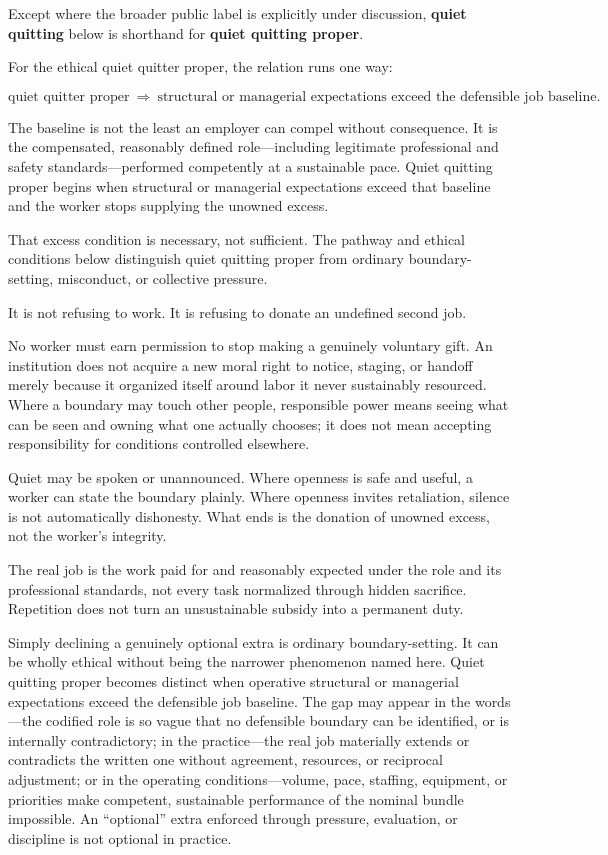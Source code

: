 \documentclass[11pt,oneside]{article}
\begin{document}
Except where the broader public label is explicitly under discussion,
\textbf{quiet quitting} below is shorthand for \textbf{quiet quitting
proper}.

For the ethical quiet quitter proper, the relation runs one way:

\[
\boxed{\text{quiet quitter proper}\ \Longrightarrow\ \text{structural or managerial expectations exceed the defensible job baseline}.}
\]

The baseline is not the least an employer can compel without
consequence. It is the compensated, reasonably defined role---including
legitimate professional and safety standards---performed competently at
a sustainable pace. Quiet quitting proper begins when structural or
managerial expectations exceed that baseline and the worker stops
supplying the unowned excess.

That excess condition is necessary, not sufficient. The pathway and
ethical conditions below distinguish quiet quitting proper from ordinary
boundary-setting, misconduct, or collective pressure.

It is not refusing to work. It is refusing to donate an undefined second
job.

No worker must earn permission to stop making a genuinely voluntary
gift. An institution does not acquire a new moral right to notice,
staging, or handoff merely because it organized itself around labor it
never sustainably resourced. Where a boundary may touch other people,
responsible power means seeing what can be seen and owning what one
actually chooses; it does not mean accepting responsibility for
conditions controlled elsewhere.

Quiet may be spoken or unannounced. Where openness is safe and useful, a
worker can state the boundary plainly. Where openness invites
retaliation, silence is not automatically dishonesty. What ends is the
donation of unowned excess, not the worker's integrity.

The real job is the work paid for and reasonably expected under the role
and its professional standards, not every task normalized through hidden
sacrifice. Repetition does not turn an unsustainable subsidy into a
permanent duty.

Simply declining a genuinely optional extra is ordinary
boundary-setting. It can be wholly ethical without being the narrower
phenomenon named here. Quiet quitting proper becomes distinct when
operative structural or managerial expectations exceed the defensible
job baseline. The gap may appear in the words---the codified role is so
vague that no defensible boundary can be identified, or is internally
contradictory; in the practice---the real job materially extends or
contradicts the written one without agreement, resources, or reciprocal
adjustment; or in the operating conditions---volume, pace, staffing,
equipment, or priorities make competent, sustainable performance of the
nominal bundle impossible. An ``optional'' extra enforced through
pressure, evaluation, or discipline is not optional in practice.
\end{document}
